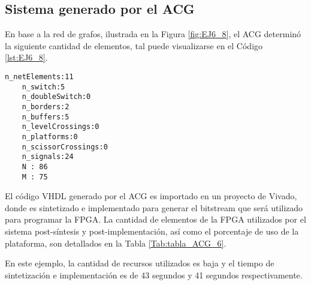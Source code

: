 \subsection{Sistema generado por el ACG}
	
	En base a la red de grafos, ilustrada en la Figura \ref{fig:EJ6_8}, el ACG determinó la siguiente cantidad de elementos, tal puede visualizarse en el Código \ref{lst:EJ6_8}.
	
	\begin{lstlisting}[language = {}, caption = Cantidad de elementos a implementar por el ACG, label = {lst:EJ6_8}]
	n_netElements:11
	n_switch:5
	n_doubleSwitch:0
	n_borders:2
	n_buffers:5
	n_levelCrossings:0
	n_platforms:0
	n_scissorCrossings:0
	n_signals:24
	N : 86
	M : 75
	\end{lstlisting}
	
	El código VHDL generado por el ACG es importado en un proyecto de Vivado, donde es sintetizado e implementado para generar el bitstream que será utilizado para programar la FPGA. La cantidad de elementos de la FPGA utilizados por el sistema post-síntesis y post-implementación, así como el porcentaje de uso de la plataforma, son detallados en la Tabla \ref{Tab:tabla_ACG_6}.
	
	\begin{table}[H]
		{
			\caption{Síntesis e implementación del ejemplo 6 generado por el ACG.}
			\label{Tab:tabla_ACG_6}
			\centering
			\begin{center}
			\end{center}
		}    
	\end{table}
	
	En este ejemplo, la cantidad de recursos utilizados es baja y el tiempo de sintetización e implementación es de 43 segundos y 41 segundos respectivamente.